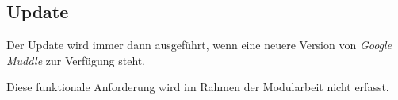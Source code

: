 \subsection{Update}
\label{subsec:funktionale-update}

Der Update wird immer dann ausgeführt, wenn eine neuere Version von
\textit{Google Muddle} zur Verfügung steht.

Diese funktionale Anforderung wird im Rahmen der Modularbeit nicht erfasst.
